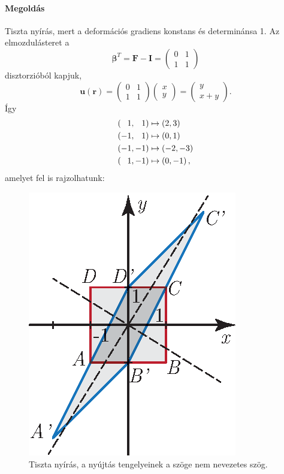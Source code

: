 \documentclass[12pt,a4paper]{scrartcl}
\let\mathbf\bm
\begin{document}
\paragraph{Megoldás} Tiszta nyírás, mert a deformációs gradiens konstans és determinánsa 1. Az elmozdulásteret a
\[{{\mathbf{\beta }}^T} = {\mathbf{F}} - {\mathbf{I}} = \left( {\begin{array}{*{20}{c}}
  0&1 \\ 
  1&1 
\end{array}} \right)\]
disztorzióból kapjuk,
\[{\mathbf{u}}\left( {\mathbf{r}} \right) = \left( {\begin{array}{*{20}{c}}
  0&1 \\ 
  1&1 
\end{array}} \right)\left( {\begin{array}{*{20}{c}}
  x \\ 
  y 
\end{array}} \right) = \left( {\begin{array}{*{20}{c}}
  y \\ 
  {x + y} 
\end{array}} \right).\]
Így
\[\begin{gathered}
  \left( {\phantom{-}1,\phantom{-}1} \right) \mapsto \left( {2,3} \right) \hfill \\
  \left( { - 1,\phantom{-}1} \right) \mapsto \left( {0,1} \right) \hfill \\
  \left( { - 1, - 1} \right) \mapsto \left( { - 2, - 3} \right) \hfill \\
  \left( {\phantom{-}1, - 1} \right) \mapsto \left( {0, - 1} \right), \hfill \\ 
\end{gathered} \]
amelyet fel is rajzolhatunk:
\begin{figure}[htb] 
\centering
\includegraphics[scale=1]{figs/nyiras_feladat2.eps}
\caption{Tiszta nyírás, a nyújtás tengelyeinek a szöge nem nevezetes szög.}
\label{fig:nyiras_pelda2}
\end{figure}
\FloatBarrier
\normalsize
\end{document}
